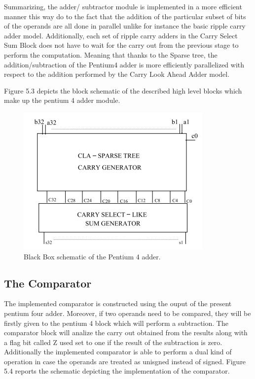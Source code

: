     Summarizing, the adder/ subtractor module is implemented in a more efficient manner this way do to the fact that the addition of the particular subset of bits of the operands
    are all done in parallel unlike for instance the basic ripple carry adder model. Additionally, each set of ripple carry adders in the Carry Select Sum Block does not have to 
    wait for the carry out from the previous stage to perform the computation. Meaning that thanks to the Sparse tree, the addition/subtraction of the Pentium4 adder is more efficiently parallelized with respect to the addition
    performed by the Carry Look Ahead Adder model.

    Figure 5.3 depicts the block schematic of the described high level blocks which make up the pentium 4 adder module.

    \begin{figure}[h!]
        \centering
        \includegraphics[scale = 1]
        {chapters/figures/Pentium4Adder}
        \caption{Black Box schematic of the Pentium 4 adder.}
        \label{fig:Pentium4Adder}
        \end{figure}

    \subsection{ The Comparator }
        The implemented comparator is constructed using the ouput of the present pentium four adder. Moreover, if two operands need to be compared,
        they will be firstly given to the pentium 4 block which will perform a subtraction. The comparator block will analize the carry out obtained from the results
        along with a flag bit called Z used set to one if the result of the subtraction is zero.
        Additionally the implemented comparator is able to perform a dual kind of operation in case the operands are treated as unisgned instead of signed.
        Figure 5.4 reports the schematic depicting the implementation of the comparator.


